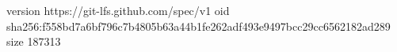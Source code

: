 version https://git-lfs.github.com/spec/v1
oid sha256:f558bd7a6bf796c7b4805b63a44b1fe262adf493e9497bcc29cc6562182ad289
size 187313
